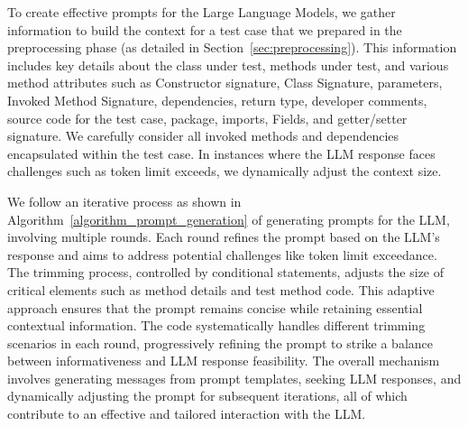 To create effective prompts for the Large Language Models, we gather information to build the context for a test case that we prepared in the preprocessing phase (as detailed in Section~\ref{sec:preprocessing}). This information includes key details about the class under test, methods under test, and various method attributes such as Constructor signature, Class Signature, parameters, Invoked Method Signature, dependencies, return type, developer comments, source code for the test case, package, imports, Fields, and getter/setter signature. We carefully consider all invoked methods and dependencies encapsulated within the test case. In instances where the LLM response faces challenges such as token limit exceeds, we dynamically adjust the context size.

We follow an iterative process as shown in Algorithm~\ref{algorithm_prompt_generation} of generating prompts for the LLM, involving multiple rounds. Each round refines the prompt based on the LLM's response and aims to address potential challenges like token limit exceedance. The trimming process, controlled by conditional statements, adjusts the size of critical elements such as method details and test method code. This adaptive approach ensures that the prompt remains concise while retaining essential contextual information. The code systematically handles different trimming scenarios in each round, progressively refining the prompt to strike a balance between informativeness and LLM response feasibility. The overall mechanism involves generating messages from prompt templates, seeking LLM responses, and dynamically adjusting the prompt for subsequent iterations, all of which contribute to an effective and tailored interaction with the LLM.

